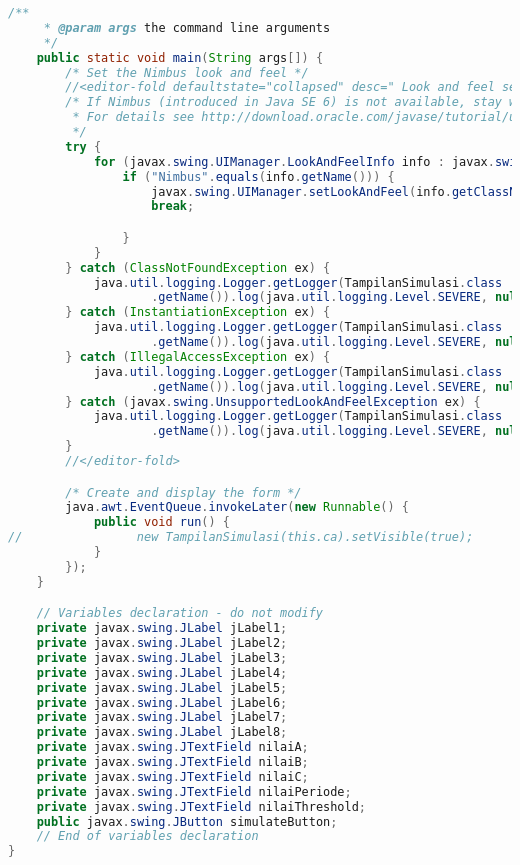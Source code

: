 \begin{lstlisting}[language=Java, caption=Entrepreneurs.java]
    /**
     * @param args the command line arguments
     */
    public static void main(String args[]) {
        /* Set the Nimbus look and feel */
        //<editor-fold defaultstate="collapsed" desc=" Look and feel setting code (optional) ">
        /* If Nimbus (introduced in Java SE 6) is not available, stay with the default look and feel.
         * For details see http://download.oracle.com/javase/tutorial/uiswing/lookandfeel/plaf.html 
         */
        try {
            for (javax.swing.UIManager.LookAndFeelInfo info : javax.swing.UIManager.getInstalledLookAndFeels()) {
                if ("Nimbus".equals(info.getName())) {
                    javax.swing.UIManager.setLookAndFeel(info.getClassName());
                    break;

                }
            }
        } catch (ClassNotFoundException ex) {
            java.util.logging.Logger.getLogger(TampilanSimulasi.class
                    .getName()).log(java.util.logging.Level.SEVERE, null, ex);
        } catch (InstantiationException ex) {
            java.util.logging.Logger.getLogger(TampilanSimulasi.class
                    .getName()).log(java.util.logging.Level.SEVERE, null, ex);
        } catch (IllegalAccessException ex) {
            java.util.logging.Logger.getLogger(TampilanSimulasi.class
                    .getName()).log(java.util.logging.Level.SEVERE, null, ex);
        } catch (javax.swing.UnsupportedLookAndFeelException ex) {
            java.util.logging.Logger.getLogger(TampilanSimulasi.class
                    .getName()).log(java.util.logging.Level.SEVERE, null, ex);
        }
        //</editor-fold>

        /* Create and display the form */
        java.awt.EventQueue.invokeLater(new Runnable() {
            public void run() {
//                new TampilanSimulasi(this.ca).setVisible(true);
            }
        });
    }

    // Variables declaration - do not modify                     
    private javax.swing.JLabel jLabel1;
    private javax.swing.JLabel jLabel2;
    private javax.swing.JLabel jLabel3;
    private javax.swing.JLabel jLabel4;
    private javax.swing.JLabel jLabel5;
    private javax.swing.JLabel jLabel6;
    private javax.swing.JLabel jLabel7;
    private javax.swing.JLabel jLabel8;
    private javax.swing.JTextField nilaiA;
    private javax.swing.JTextField nilaiB;
    private javax.swing.JTextField nilaiC;
    private javax.swing.JTextField nilaiPeriode;
    private javax.swing.JTextField nilaiThreshold;
    public javax.swing.JButton simulateButton;
    // End of variables declaration                   
}

\end{lstlisting}

